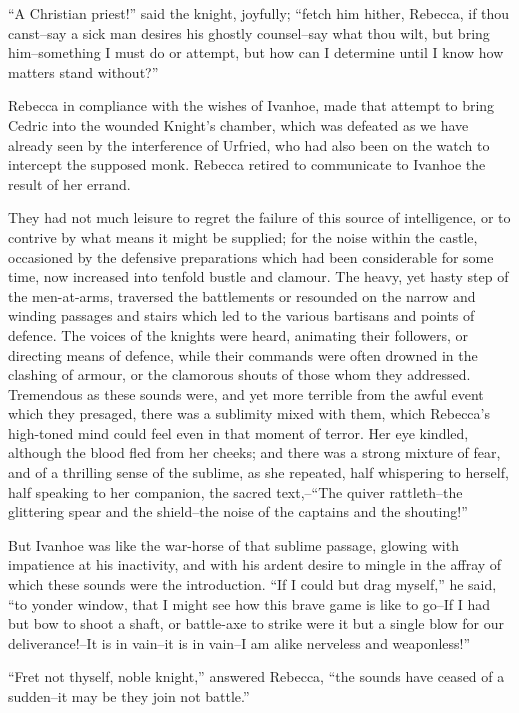 ``A Christian priest!'' said the knight, joyfully; ``fetch him hither,
Rebecca, if thou canst--say a sick man desires his ghostly counsel--say
what thou wilt, but bring him--something I must do or attempt, but how
can I determine until I know how matters stand without?''

Rebecca in compliance with the wishes of Ivanhoe, made that attempt to
bring Cedric into the wounded Knight's chamber, which was defeated as we
have already seen by the interference of Urfried, who had also been on
the watch to intercept the supposed monk. Rebecca retired to communicate
to Ivanhoe the result of her errand.

They had not much leisure to regret the failure of this source of
intelligence, or to contrive by what means it might be supplied; for the
noise within the castle, occasioned by the defensive preparations which
had been considerable for some time, now increased into tenfold bustle
and clamour. The heavy, yet hasty step of the men-at-arms, traversed the
battlements or resounded on the narrow and winding passages and stairs
which led to the various bartisans and points of defence. The voices of
the knights were heard, animating their followers, or directing means of
defence, while their commands were often drowned in the clashing of
armour, or the clamorous shouts of those whom they addressed. Tremendous
as these sounds were, and yet more terrible from the awful event which
they presaged, there was a sublimity mixed with them, which Rebecca's
high-toned mind could feel even in that moment of terror. Her eye
kindled, although the blood fled from her cheeks; and there was a strong
mixture of fear, and of a thrilling sense of the sublime, as she
repeated, half whispering to herself, half speaking to her companion,
the sacred text,--``The quiver rattleth--the glittering spear and the
shield--the noise of the captains and the shouting!''

But Ivanhoe was like the war-horse of that sublime passage, glowing with
impatience at his inactivity, and with his ardent desire to mingle in
the affray of which these sounds were the introduction. ``If I could but
drag myself,'' he said, ``to yonder window, that I might see how this
brave game is like to go--If I had but bow to shoot a shaft, or
battle-axe to strike were it but a single blow for our deliverance!--It
is in vain--it is in vain--I am alike nerveless and weaponless!''

``Fret not thyself, noble knight,'' answered Rebecca, ``the sounds have
ceased of a sudden--it may be they join not battle.''

